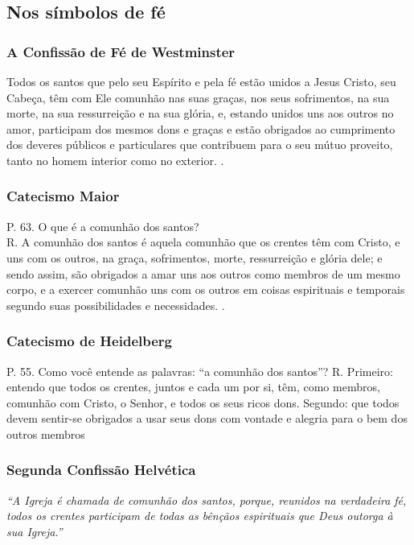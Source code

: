 \subsection{Nos símbolos de fé}

\subsubsection{A Confissão de Fé de Westminster} 
\begin{citacao}
Todos os santos que pelo seu Espírito e pela fé estão unidos a Jesus Cristo, seu Cabeça, têm com Ele comunhão nas suas graças, nos seus sofrimentos, na sua morte, na sua ressurreição e na sua glória, e, estando unidos uns aos outros no amor, participam dos mesmos dons e graças e estão obrigados ao cumprimento dos deveres públicos e particulares que contribuem para o seu mútuo proveito, tanto no homem interior como no exterior. \cite{cfw}.
\end{citacao}

\subsubsection{Catecismo Maior} 
\begin{citacao}
P. 63. O que é a comunhão dos santos? \\
R. A comunhão dos santos é aquela comunhão que os crentes têm com Cristo, e uns com os outros, na graça, sofrimentos, morte, ressurreição e glória dele; e sendo assim, são obrigados a amar uns aos outros como membros de um mesmo corpo, e a exercer comunhão uns com os outros em coisas espirituais e temporais segundo suas possibilidades e necessidades. \cite{catecismoMaior}.
\end{citacao}

\subsubsection{Catecismo de Heidelberg}
\begin{citacao}
P. 55. Como você entende as palavras: ``a comunhão dos santos''?
R. Primeiro: entendo que todos os crentes, juntos e cada um por si, têm, como membros, comunhão com Cristo, o Senhor, e todos os seus ricos dons. Segundo: que todos devem sentir-se obrigados a usar seus dons com vontade e alegria para o bem dos outros membros \cite{heidelberg}
\end{citacao}

\subsubsection{Segunda Confissão Helvética} 
\textit{``A Igreja é chamada de comunhão dos santos, porque, reunidos na verdadeira fé, todos os crentes participam de todas as bênçãos espirituais que Deus outorga à sua Igreja.''} \cite{helvetica}

